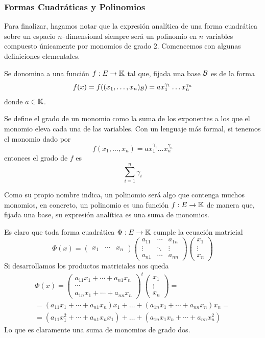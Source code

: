 \subsubsection{Formas Cuadráticas y Polinomios}
Para finalizar, hagamos notar que la expresión analítica de una forma cuadrática sobre un espacio $n$--dimensional siempre será un polinomio en $n$ variables compuesto únicamente por monomios de grado $2$. Comencemos con algunas definiciones elementales.
\begin{defi}[Monomio]
	Se donomina  a una función $f:E\to\mathbb{K}$ tal que, fijada una base $\mathcal{B}$ es de la forma
	\begin{equation*}f(x)=f((x_1,\dots,x_n)_{\mathcal{B}})=ax_1^{\gamma_1}\dots x_n^{\gamma_n}\end{equation*}
	donde $a\in\mathbb{K}$.
\end{defi}
\begin{defi}
	Se define el grado de un monomio como la suma de los exponentes a los que el monomio eleva cada una de las variables. Con un lenguaje más formal, si tenemos el monomio dado por \[f(x_1,\dots,x_n)=ax_1^{\gamma_1}\dots x_n^{\gamma_n}\] entonces el grado de $f$ es
	\[\sum_{i=1}^{n}\gamma_i\]
\end{defi}
\begin{defi}[Polinomio]
	Como su propio nombre indica, un polinomio será algo que contenga muchos monomios, en concreto, un polinomio es una función $f:E\to\mathbb{K}$ de manera que, fijada una base, su expresión analítica es una suma de monomios.
\end{defi}
Es claro que toda forma cuadrática $\Phi:E\to\mathbb{K}$ cumple la ecuación matricial
\[\Phi(x)=\begin{pmatrix}
x_1 & \cdots & x_n
\end{pmatrix}\begin{pmatrix}
a_{11} & \cdots & a_{1n}\\
\vdots & \ddots & \vdots\\
a_{n1} & \cdots & a_{nn}
\end{pmatrix}\begin{pmatrix}
x_1\\
\vdots\\
x_n
\end{pmatrix}\]
Si desarrollamos los productos matriciales nos queda
\begin{multline}\Phi(x)=\begin{pmatrix}
a_{11}x_1 + \cdots + a_{n1}x_n\\
\cdots\\
a_{1n}x_1 + \cdots + a_{nn}x_n
\end{pmatrix}^t\begin{pmatrix}
x_1\\
\vdots\\
x_n
\end{pmatrix}=\\=(a_{11}x_1 + \cdots + a_{n1}x_n)x_1+\dots+(a_{1n}x_1 + \cdots + a_{nn}x_n)x_n=\\=(a_{11}x_1^2 + \cdots + a_{n1}x_nx_1)+\dots +(a_{1n}x_1x_n + \cdots + a_{nn}x_n^2)\end{multline}
Lo que es claramente una suma de monomios de grado dos. 
